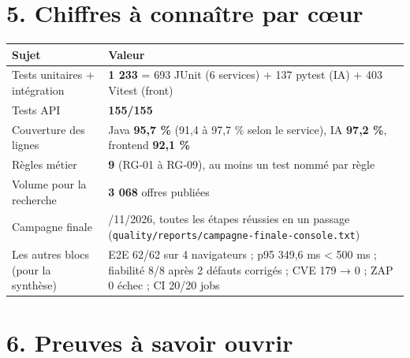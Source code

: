 \documentclass[
  11pt,
]{article}
\begin{document}
\section{5. Chiffres à connaître par
cœur}\label{5-chiffres-uxe0-connauxeetre-par-cux153ur}

\begin{longtable}[]{@{}
  >{\raggedright\arraybackslash}p{}
  >{\raggedright\arraybackslash}p{}@{}}
\toprule\noalign{}
\begin{minipage}[b]{\linewidth}\raggedright
Sujet
\end{minipage} & \begin{minipage}[b]{\linewidth}\raggedright
Valeur
\end{minipage} \\
\midrule\noalign{}
\endhead
\bottomrule\noalign{}
\endlastfoot
Tests unitaires + intégration & \textbf{1 233} = 693 JUnit (6 services)
+ 137 pytest (IA) + 403 Vitest (front) \\
Tests API & \textbf{155/155} \\
Couverture des lignes & Java \textbf{95,7 \%} (91,4 à 97,7 \% selon le
service), IA \textbf{97,2 \%}, frontend \textbf{92,1 \%} \\
Règles métier & \textbf{9} (RG‑01 à RG‑09), au moins un test nommé par
règle \\
Volume pour la recherche & \textbf{3 068} offres publiées \\
Campagne finale & 11/11/2026, toutes les étapes réussies en un passage
(\texttt{quality/}\allowbreak{}\texttt{reports/}\allowbreak{}\texttt{campagne-}\allowbreak{}\texttt{finale-}\allowbreak{}\texttt{console.}\allowbreak{}\texttt{txt}) \\
Les autres blocs (pour la synthèse) & E2E 62/62 sur 4 navigateurs ; p95
349,6 ms \textless{} 500 ms ; fiabilité 8/8 après 2 défauts corrigés ;
CVE 179 → 0 ; ZAP 0 échec ; CI 20/20 jobs \\
\end{longtable}

\section{6. Preuves à savoir ouvrir}\label{6-preuves-uxe0-savoir-ouvrir}
\end{document}
